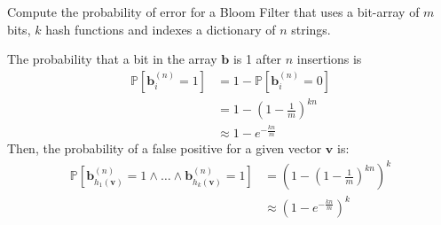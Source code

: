 \exercise

Compute the probability of error for a Bloom Filter that uses a bit-array of $m$
bits, $k$ hash functions and indexes a dictionary of $n$ strings.

\solution

The probability that a bit in the array $\mathbf{b}$ is 1 after $n$ insertions
is
%
\begin{align*}
  \mathbb{P}[\mathbf{b}_i^{(n)} = 1] &= 1 - \mathbb{P}[\mathbf{b}_i^{(n)} = 0]\\
  &= 1 - \left( 1 - \frac{1}{m} \right)^{kn} \\
  &\approx 1 - e^{-\frac{kn}{m}}
\end{align*}
%
Then, the probability of a false positive for a given vector $\mathbf{v}$ is:
%
\begin{align*}
  \mathbb{P}[\mathbf{b}_{h_1(\mathbf{v})}^{(n)} = 1 \wedge \dots \wedge
  \mathbf{b}_{h_k(\mathbf{v})}^{(n)} = 1] &= \left(1 - \left( 1 - \frac{1}{m}
  \right)^{kn} \right)^k \\ &\approx \left(1 - e^{-\frac{kn}{m}} \right)^k
\end{align*}
